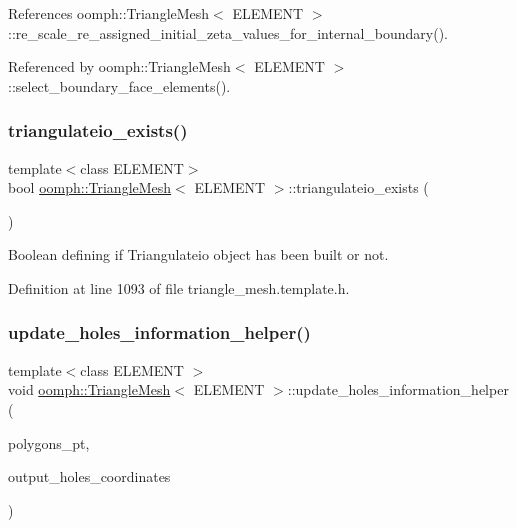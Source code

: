 References oomph\+::\+Triangle\+Mesh$<$ E\+L\+E\+M\+E\+N\+T $>$\+::re\+\_\+scale\+\_\+re\+\_\+assigned\+\_\+initial\+\_\+zeta\+\_\+values\+\_\+for\+\_\+internal\+\_\+boundary().



Referenced by oomph\+::\+Triangle\+Mesh$<$ E\+L\+E\+M\+E\+N\+T $>$\+::select\+\_\+boundary\+\_\+face\+\_\+elements().

\mbox{\label{classoomph_1_1TriangleMesh_ae363c369eaae0841ec326cb8f6752550}} 
\subsubsection{\texorpdfstring{triangulateio\+\_\+exists()}{triangulateio\_exists()}}
{\footnotesize\ttfamily template$<$class E\+L\+E\+M\+E\+NT$>$ \\
bool \hyperlink{classoomph_1_1TriangleMesh}{oomph\+::\+Triangle\+Mesh}$<$ E\+L\+E\+M\+E\+NT $>$\+::triangulateio\+\_\+exists (\begin{DoxyParamCaption}{ }\end{DoxyParamCaption})\hspace{0.3cm}{\ttfamily [inline]}}



Boolean defining if Triangulateio object has been built or not. 



Definition at line 1093 of file triangle\+\_\+mesh.\+template.\+h.

\mbox{\label{classoomph_1_1TriangleMesh_ae03156e70bf50cf8a600e2046bdbe3c3}} 
\subsubsection{\texorpdfstring{update\+\_\+holes\+\_\+information\+\_\+helper()}{update\_holes\_information\_helper()}}
{\footnotesize\ttfamily template$<$class E\+L\+E\+M\+E\+NT $>$ \\
void \hyperlink{classoomph_1_1TriangleMesh}{oomph\+::\+Triangle\+Mesh}$<$ E\+L\+E\+M\+E\+NT $>$\+::update\+\_\+holes\+\_\+information\+\_\+helper (\begin{DoxyParamCaption}\item[{Vector$<$ Triangle\+Mesh\+Polygon $\ast$$>$ \&}]{polygons\+\_\+pt,  }\item[{Vector$<$ Vector$<$ double $>$ $>$ \&}]{output\+\_\+holes\+\_\+coordinates }\end{DoxyParamCaption})\hspace{0.3cm}{\ttfamily [protected]}}



